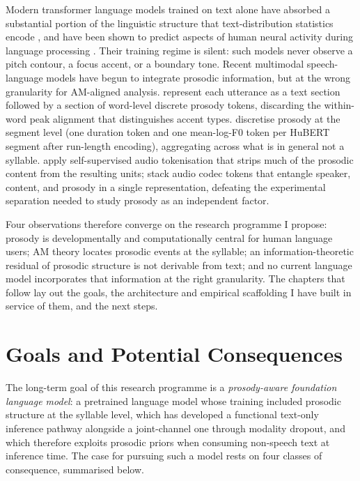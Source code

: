 \documentclass[11pt,letterpaper]{article}
\begin{document}
Modern transformer language models trained on text alone have absorbed a substantial portion of the linguistic structure that text-distribution statistics encode \citep{vaswani2017, brown2020, touvron2023}, and have been shown to predict aspects of human neural activity during language processing \citep{goldstein2022, caucheteux2023}. Their training regime is silent: such models never observe a pitch contour, a focus accent, or a boundary tone. Recent multimodal speech-language models \citep{hassid2023textually, defossez2024moshi, lin2025prosodylm} have begun to integrate prosodic information, but at the wrong granularity for AM-aligned analysis. \citet{lin2025prosodylm} represent each utterance as a text section followed by a section of word-level discrete prosody tokens, discarding the within-word peak alignment that distinguishes accent types. \citet{kharitonov2022pgslm} discretise prosody at the segment level (one duration token and one mean-log-F0 token per HuBERT segment after run-length encoding), aggregating across what is in general not a syllable. \citet{hsu2021hubert} apply self-supervised audio tokenisation that strips much of the prosodic content from the resulting units; \citet{defossez2024moshi} stack audio codec tokens that entangle speaker, content, and prosody in a single representation, defeating the experimental separation needed to study prosody as an independent factor.

Four observations therefore converge on the research programme I propose: prosody is developmentally and computationally central for human language users; AM theory locates prosodic events at the syllable; an information-theoretic residual of prosodic structure is not derivable from text; and no current language model incorporates that information at the right granularity. The chapters that follow lay out the goals, the architecture and empirical scaffolding I have built in service of them, and the next steps.

\section{Goals and Potential Consequences}\label{sec:goals}

The long-term goal of this research programme is a \emph{prosody-aware foundation language model}: a pretrained language model whose training included prosodic structure at the syllable level, which has developed a functional text-only inference pathway alongside a joint-channel one through modality dropout, and which therefore exploits prosodic priors when consuming non-speech text at inference time. The case for pursuing such a model rests on four classes of consequence, summarised below.
\end{document}
